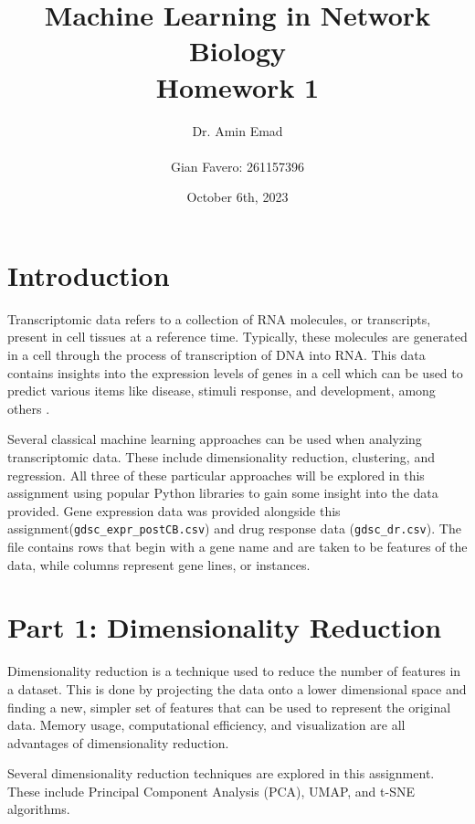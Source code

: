 \documentclass[12pt]{article}
\begin{document}
\title{Machine Learning in Network Biology\\Homework 1}
\author{
    Dr. Amin Emad \\ \\
    Gian Favero: 261157396 \\
}
\date{October 6th, 2023}
\maketitle
\newpage


\section{Introduction}
Transcriptomic data refers to a collection of RNA molecules, or transcripts, present in cell tissues at a reference time. Typically, these molecules are generated in a cell through the process of transcription of DNA into RNA. This data contains insights into the expression levels of genes in a cell which can be used to predict various items like disease, stimuli response, and development, among others \cite{noauthor_transcriptome_nodate}.

Several classical machine learning approaches can be used when analyzing transcriptomic data. These include dimensionality reduction, clustering, and regression. All three of these particular approaches will be explored in this assignment using popular Python libraries to gain some insight into the data provided. Gene expression data was provided alongside this assignment(\verb|gdsc_expr_postCB.csv|) and drug response data (\verb|gdsc_dr.csv|). The file contains rows that begin with a gene name and are taken to be features of the data, while columns represent gene lines, or instances. 

\section{Part 1: Dimensionality Reduction}
Dimensionality reduction is a technique used to reduce the number of features in a dataset. This is done by projecting the data onto a lower dimensional space and finding a new, simpler set of features that can be used to represent the original data. Memory usage, computational efficiency, and visualization are all advantages of dimensionality reduction.

Several dimensionality reduction techniques are explored in this assignment. These include Principal Component Analysis (PCA), UMAP, and t-SNE algorithms.
\end{document}
